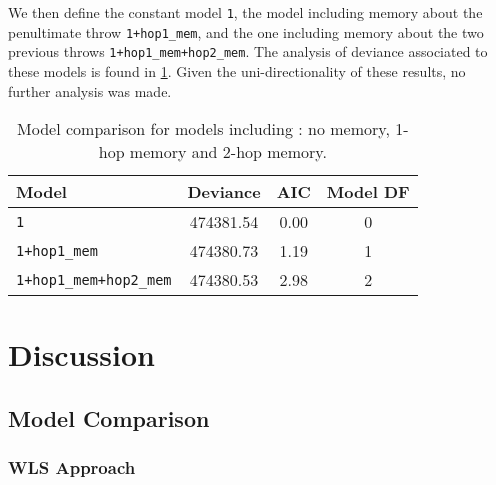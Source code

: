 \documentclass[a4paper, 12pt,oneside]{article}
\begin{document}
		We then define the constant model \texttt{1}, the model including memory about the penultimate throw \texttt{1+hop1\_mem}, and the one including memory about the two previous throws \texttt{1+hop1\_mem+hop2\_mem}. The analysis of deviance associated to these models is found in \ref{tab:memory-model-comparison}. Given the uni-directionality of these results, no further analysis was made.  
		\begin{table}[htb]
			\centering
			\caption{Model comparison for models including : no memory, 1-hop memory and 2-hop memory.}
			\label{tab:memory-model-comparison}
			\begin{tabular}{lccc}
			\toprule
			Model & Deviance & AIC & Model DF \\
			\midrule
			\texttt{1} & 474381.54 & 0.00 & 0 \\
			\texttt{1+hop1\_mem} & 474380.73 & 1.19 & 1 \\
			\texttt{1+hop1\_mem+hop2\_mem} & 474380.53 & 2.98 & 2 \\
			\bottomrule
			\end{tabular}
		\end{table}
	\section{Discussion}
		\subsection{Model Comparison}
		\subsubsection{WLS Approach}
\end{document}
